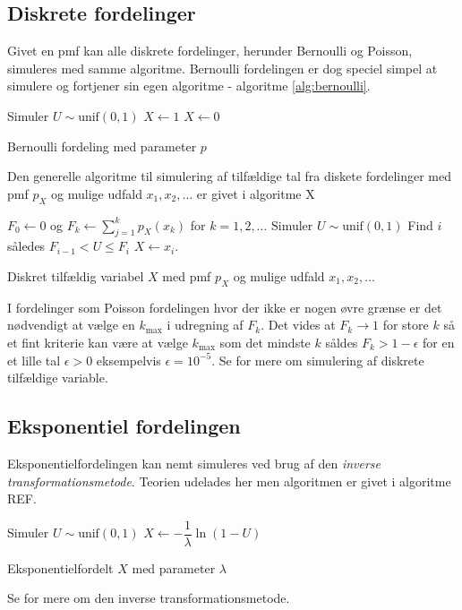 \subsection{Diskrete fordelinger}
Givet en pmf kan alle diskrete fordelinger, herunder Bernoulli og Poisson, simuleres med samme algoritme. Bernoulli fordelingen er dog speciel simpel at simulere og fortjener sin egen algoritme - algoritme \ref{alg:bernoulli}. 
\begin{algorithm}[H]
\begin{algorithmic}
\STATE Simuler $U \sim \text{unif}(0,1)$
\STATE $X \gets 1$
\ELSE
\STATE $X \gets 0$
\ENDIF
\end{algorithmic}
\caption{Bernoulli fordeling med parameter $p$} \label{alg:bernoulli}
\end{algorithm}
Den generelle algoritme til simulering af tilfældige tal fra diskete fordelinger med pmf $p_X$ og mulige udfald $x_1, x_2,\dots$ er givet i algoritme X
\begin{algorithm}[H]
\begin{algorithmic}
\STATE $F_0 \gets 0$ og $F_k \gets \sum_{j=1}^k p_X(x_k)$ for $k = 1,2,\dots$ 
\STATE Simuler $U \sim \text{unif}(0,1)$
\STATE Find $i$ således $F_{i-1} < U \leq F_i$
\STATE $X \gets x_i$. 
\end{algorithmic}
\caption{Diskret tilfældig variabel $X$ med pmf $p_X$ og mulige udfald $x_1,x_2,\dots$} \label{alg:bernoulli}
\end{algorithm}
I fordelinger som Poisson fordelingen hvor der ikke er nogen øvre grænse er det nødvendigt at vælge en $k_{\max}$ i udregning af $F_k$. Det vides at $F_k \to 1$ for store $k$ så et fint kriterie kan være at vælge $k_{\max}$ som det mindste $k$ såldes $F_k > 1 - \epsilon$ for en et lille tal $\epsilon > 0$ eksempelvis $\epsilon = 10^{-5}$. Se \cite[283-285]{olofsson2012} for mere om simulering af diskrete tilfældige variable. 
\subsection{Eksponentiel fordelingen}
Eksponentielfordelingen kan nemt simuleres ved brug af den \emph{inverse transformationsmetode}. Teorien udelades her men algoritmen er givet i algoritme REF.
\begin{algorithm}[H]
\begin{algorithmic}
\STATE Simuler $U \sim \text{unif}(0,1)$
\STATE $X \gets -\dfrac{1}{\lambda}\ln(1-U)$ 
\end{algorithmic}
\caption{Eksponentielfordelt $X$ med parameter $\lambda$} \label{alg:eksponential}
\end{algorithm}
Se \cite[285-287]{olofsson2012} for mere om den inverse transformationsmetode. 
